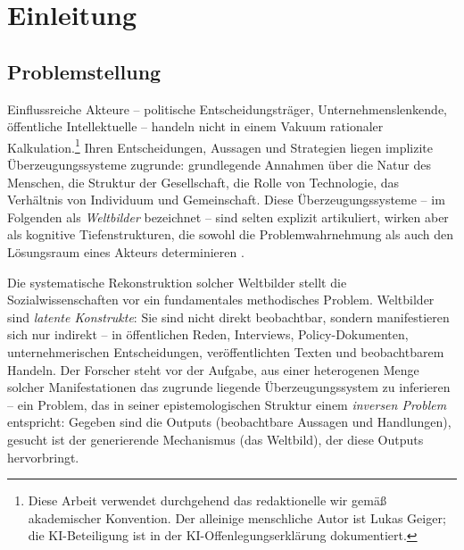 \documentclass[11pt,a4paper]{article}
\theoremstyle{definition}
\theoremstyle{plain}
\theoremstyle{remark}
\begin{document}
\newpage
\setcounter{page}{1}


\section{Einleitung}
\label{sec:einleitung}

\subsection{Problemstellung}
\label{sec:problemstellung}

Einflussreiche Akteure -- politische Entscheidungstr\"ager, Unternehmenslenkende, \"offentliche Intellektuelle -- handeln nicht in einem Vakuum rationaler Kalkulation.\footnote{Diese Arbeit verwendet durchgehend das redaktionelle \glqq wir\grqq{} gem\"a\ss{} akademischer Konvention. Der alleinige menschliche Autor ist Lukas Geiger; die KI-Beteiligung ist in der KI-Offenlegungserkl\"arung dokumentiert.} Ihren Entscheidungen, Aussagen und Strategien liegen implizite \"Uberzeugungssysteme zugrunde: grundlegende Annahmen \"uber die Natur des Menschen, die Struktur der Gesellschaft, die Rolle von Technologie, das Verh\"altnis von Individuum und Gemeinschaft. Diese \"Uberzeugungssysteme -- im Folgenden als \emph{Weltbilder} bezeichnet -- sind selten explizit artikuliert, wirken aber als kognitive Tiefenstrukturen, die sowohl die Problemwahrnehmung als auch den L\"osungsraum eines Akteurs determinieren \citep{Mannheim1929, BergerLuckmann1966}.

Die systematische Rekonstruktion solcher Weltbilder stellt die Sozialwissenschaften vor ein fundamentales methodisches Problem. Weltbilder sind \emph{latente Konstrukte}: Sie sind nicht direkt beobachtbar, sondern manifestieren sich nur indirekt -- in \"offentlichen Reden, Interviews, Policy-Dokumenten, unternehmerischen Entscheidungen, ver\"offentlichten Texten und beobachtbarem Handeln. Der Forscher steht vor der Aufgabe, aus einer heterogenen Menge solcher Manifestationen das zugrunde liegende \"Uberzeugungssystem zu inferieren -- ein Problem, das in seiner epistemologischen Struktur einem \emph{inversen Problem} entspricht: Gegeben sind die Outputs (beobachtbare Aussagen und Handlungen), gesucht ist der generierende Mechanismus (das Weltbild), der diese Outputs hervorbringt.
\end{document}
